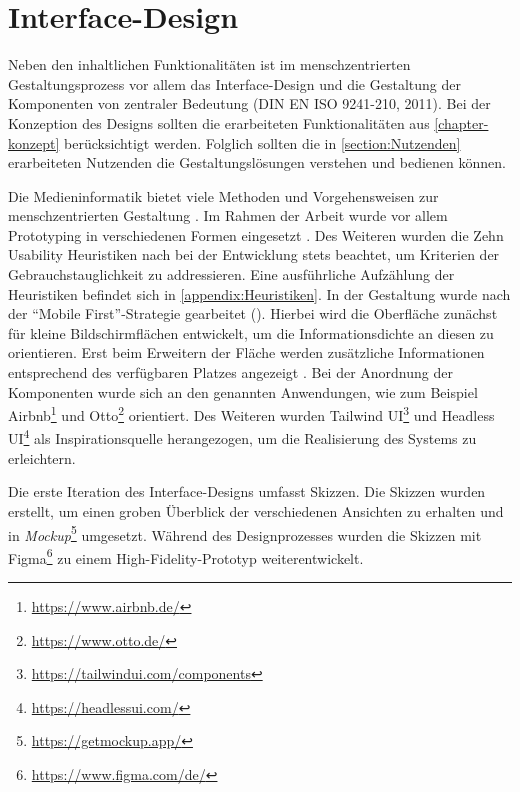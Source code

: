 \chapter{Interface-Design}
\label{chapter-design}
Neben den inhaltlichen Funktionalitäten ist im menschzentrierten
Gestaltungsprozess vor allem das Interface-Design und die Gestaltung der
Komponenten von zentraler Bedeutung \cite{DINISO9241} (DIN EN ISO 9241-210,
2011). Bei der Konzeption des Designs sollten die erarbeiteten Funktionalitäten
aus \ref{chapter-konzept} berücksichtigt werden. Folglich sollten die in
\ref{section:Nutzenden} erarbeiteten Nutzenden die Gestaltungslösungen verstehen
und bedienen können.

Die Medieninformatik bietet viele Methoden und Vorgehensweisen zur menschzentrierten Gestaltung
\cite{HerczegIDE2009}. Im Rahmen der Arbeit wurde vor allem Prototyping in verschiedenen Formen
eingesetzt \cite{HerczegMDI2009}. Des Weiteren wurden die Zehn Usability Heuristiken nach
 bei der Entwicklung stets beachtet, um Kriterien der
Gebrauchstauglichkeit zu addressieren. Eine ausführliche Aufzählung der Heuristiken befindet sich in
\ref{appendix:Heuristiken}. In der Gestaltung wurde nach der \enquote{Mobile First}-Strategie
gearbeitet (). Hierbei wird die Oberfläche zunächst für kleine Bildschirmflächen
entwickelt, um die Informationsdichte an diesen zu orientieren. Erst beim Erweitern der Fläche
werden zusätzliche Informationen entsprechend des verfügbaren Platzes angezeigt
\cite{kim_chapter_2013}. Bei der Anordnung der Komponenten wurde sich an den
 genannten Anwendungen, wie zum Beispiel
Airbnb\footnote{\url{https://www.airbnb.de/}} und Otto\footnote{\url{https://www.otto.de/}}
orientiert. Des Weiteren wurden Tailwind UI\footnote{\url{https://tailwindui.com/components}} und
Headless UI\footnote{\url{https://headlessui.com/}} als Inspirationsquelle herangezogen, um die
Realisierung des Systems zu erleichtern.

Die erste Iteration des Interface-Designs umfasst Skizzen. Die Skizzen wurden
erstellt, um einen groben Überblick der verschiedenen Ansichten zu erhalten und
in \textit{Mockup}\footnote{\url{https://getmockup.app/}} umgesetzt. Während des
Designprozesses wurden die Skizzen mit
Figma\footnote{\url{https://www.figma.com/de/}} zu einem High-Fidelity-Prototyp
weiterentwickelt.

